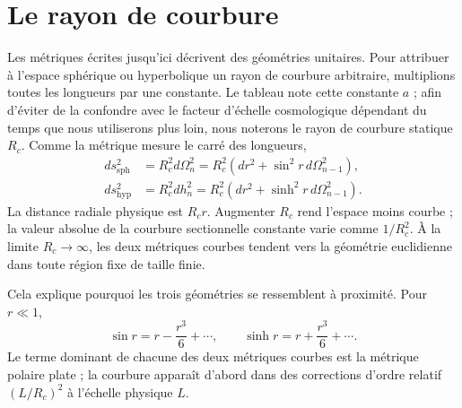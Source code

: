 \section{Le rayon de courbure}

Les métriques écrites jusqu’ici décrivent des géométries unitaires. Pour attribuer à l’espace sphérique ou hyperbolique un rayon de courbure arbitraire, multiplions toutes les longueurs par une constante. Le tableau note cette constante \(a\) ; afin d’éviter de la confondre avec le facteur d’échelle cosmologique dépendant du temps que nous utiliserons plus loin, nous noterons le rayon de courbure statique \(R_c\). Comme la métrique mesure le carré des longueurs,
\begin{align}
ds_{\mathrm{sph}}^2
  &=R_c^2d\Omega_n^2
   =R_c^2\left(dr^2+\sin^2r\,d\Omega_{n-1}^2\right),\\
ds_{\mathrm{hyp}}^2
  &=R_c^2dh_n^2
   =R_c^2\left(dr^2+\sinh^2r\,d\Omega_{n-1}^2\right).
\label{eq:c03-scaled-curvature}
\end{align}
La distance radiale physique est \(R_cr\). Augmenter \(R_c\) rend l’espace moins courbe ; la valeur absolue de la courbure sectionnelle constante varie comme \(1/R_c^2\). À la limite \(R_c\to\infty\), les deux métriques courbes tendent vers la géométrie euclidienne dans toute région fixe de taille finie.

\begin{classroomqa}
\end{classroomqa}

Cela explique pourquoi les trois géométries se ressemblent à proximité. Pour \(r\ll1\),
\begin{equation}
\sin r=r-\frac{r^3}{6}+\cdots,
\qquad
\sinh r=r+\frac{r^3}{6}+\cdots.
\end{equation}
Le terme dominant de chacune des deux métriques courbes est la métrique polaire plate ; la courbure apparaît d’abord dans des corrections d’ordre relatif \((L/R_c)^2\) à l’échelle physique \(L\).

